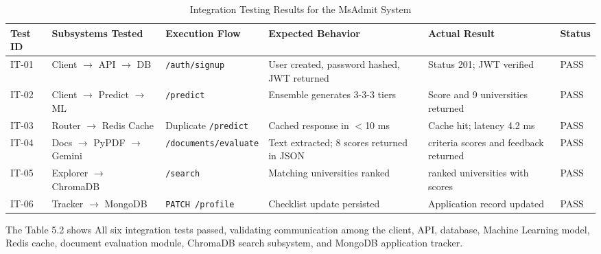 \begin{table}[htbp]
\centering
\caption{Integration Testing Results for the MsAdmit System}
\label{tab:integration-testing}

\normalsize
\setlength{\tabcolsep}{5pt}
\renewcommand{\arraystretch}{1.6}

\begin{tabularx}{\textwidth}{
|>{\centering\arraybackslash}p{1.0cm}
|>{\raggedright\arraybackslash}X
|>{\raggedright\arraybackslash}X
|>{\raggedright\arraybackslash}X
|>{\raggedright\arraybackslash}X
|>{\centering\arraybackslash}p{1.2cm}|}
\hline
\textbf{Test ID} &
\textbf{Subsystems Tested} &
\textbf{Execution Flow} &
\textbf{Expected Behavior} &
\textbf{Actual Result} &
\textbf{Status} \\
\hline

IT-01 &
Client $\rightarrow$ API $\rightarrow$ DB &
\texttt{/auth/signup} &
User created, password hashed, JWT returned &
Status 201; JWT verified &
PASS \\
\hline

IT-02 &
Client $\rightarrow$ Predict $\rightarrow$ ML &
\texttt{/predict} &
Ensemble generates 3-3-3 tiers &
Score and 9 universities returned &
PASS \\
\hline

IT-03 &
Router $\rightarrow$ Redis Cache &
Duplicate \texttt{/predict} &
Cached response in $<$10 ms &
Cache hit; latency 4.2 ms &
PASS \\
\hline

IT-04 &
Docs $\rightarrow$ PyPDF $\rightarrow$ Gemini &
\texttt{/documents/evaluate} &
Text extracted; 8 scores returned in JSON &
8 criteria scores and feedback returned &
PASS \\
\hline

IT-05 &
Explorer $\rightarrow$ ChromaDB &
\texttt{/search} &
Matching universities ranked &
6 ranked universities with scores &
PASS \\
\hline

IT-06 &
Tracker $\rightarrow$ MongoDB &
\texttt{PATCH /profile} &
Checklist update persisted &
Application record updated &
PASS \\
\hline

\end{tabularx}
\end{table}

\vspace{25pt}


The Table 5.2 shows All six integration tests passed, validating communication among
the client, API, database, Machine Learning model, Redis cache,
document evaluation module, ChromaDB search subsystem, and
MongoDB application tracker.


